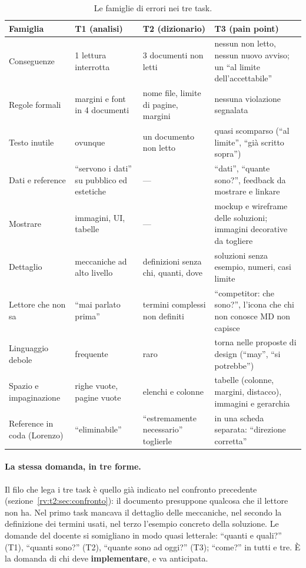 \begin{table}[htbp]
  \centering
  \caption{Le famiglie di errori nei tre task.}
  \label{rv:t3:tab:famiglie}
  \small
  \begin{tabular}{@{}p{2.8cm}p{2.7cm}p{2.9cm}p{3.3cm}@{}}
    \toprule
    \textbf{Famiglia} & \textbf{T1 (analisi)} & \textbf{T2 (dizionario)} &
    \textbf{T3 (pain point)} \\
    \midrule
    Conseguenze & 1 lettura interrotta & 3 documenti non letti & nessun non
      letto, nessun nuovo avviso; un ``al limite dell'accettabile'' \\
    \addlinespace
    Regole formali & margini e font in 4 documenti & nome file, limite di
      pagine, margini & nessuna violazione segnalata \\
    \addlinespace
    Testo inutile & ovunque & un documento non letto & quasi scomparso (``al
      limite'', ``già scritto sopra'') \\
    \addlinespace
    Dati e reference & ``servono i dati'' su pubblico ed estetiche & --- &
      ``dati'', ``quante sono?'', feedback da mostrare e linkare \\
    \addlinespace
    Mostrare & immagini, UI, tabelle & --- & mockup e wireframe delle
      soluzioni; immagini decorative da togliere \\
    \addlinespace
    Dettaglio & meccaniche ad alto livello & definizioni senza chi, quanti,
      dove & soluzioni senza esempio, numeri, casi limite \\
    \addlinespace
    Lettore che non sa & ``mai parlato prima'' & termini complessi non
      definiti & ``competitor: che sono?'', l'icona che chi non conosce MD
      non capisce \\
    \addlinespace
    Linguaggio debole & frequente & raro & torna nelle proposte di design
      (``may'', ``si potrebbe'') \\
    \addlinespace
    Spazio e impaginazione & righe vuote, pagine vuote & elenchi e colonne &
      tabelle (colonne, margini, distacco), immagini e gerarchia \\
    \addlinespace
    Reference in coda (Lorenzo) & ``eliminabile'' & ``estremamente
      necessario'' toglierle & in una scheda separata: ``direzione
      corretta'' \\
    \bottomrule
  \end{tabular}
\end{table}

\paragraph{La stessa domanda, in tre forme.} Il filo che lega i tre task è
quello già indicato nel confronto precedente
(sezione~\ref{rv:t2:sec:confronto}): il documento presuppone qualcosa che il
lettore non ha. Nel primo task mancava il dettaglio delle meccaniche, nel
secondo la definizione dei termini usati, nel terzo l'esempio concreto della
soluzione. Le domande del docente si somigliano in modo quasi letterale:
``quanti e quali?'' (T1), ``quanti sono?'' (T2), ``quante sono ad oggi?''
(T3); ``come?'' in tutti e tre. È la domanda di chi deve
\textbf{implementare}, e va anticipata.

